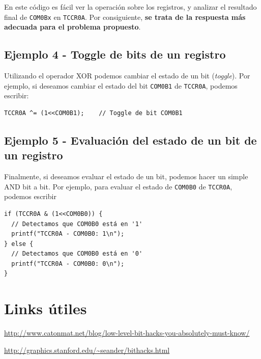 \documentclass[paper=a4, fontsize=11pt]{scrartcl}	%
\numberwithin{equation}{section} %
\numberwithin{figure}{section} %
\numberwithin{table}{section} %
\begin{document}
En este código es fácil ver la operación sobre los registros,
y analizar el resultado final de \verb|COM0Bx| en \verb|TCCR0A|. Por
consiguiente, \textbf{se trata de la respuesta más adecuada para el
problema propuesto}.

\subsection{Ejemplo 4 - Toggle de bits de un registro}

Utilizando el operador XOR podemos cambiar el estado de un bit
(\emph{toggle}). Por ejemplo, si deseamos cambiar el estado del bit
\verb|COM0B1| de \verb|TCCR0A|, podemos escribir:

\begin{verbatim}
TCCR0A ^= (1<<COM0B1);    // Toggle de bit COM0B1
\end{verbatim}

\subsection{Ejemplo 5 - Evaluación del estado de un bit de un registro}

Finalmente, si deseamos evaluar el estado de un bit, podemos
hacer un simple AND {bit a bit}. Por ejemplo, para evaluar el
estado de \verb|COM0B0| de \verb|TCCR0A|, podemos escribir

\begin{verbatim}
if (TCCR0A & (1<<COM0B0)) {
  // Detectamos que COM0B0 está en '1'
  printf("TCCR0A - COM0B0: 1\n");
} else {
  // Detectamos que COM0B0 está en '0'
  printf("TCCR0A - COM0B0: 0\n");
}
\end{verbatim}

\section{Links útiles}

{
  \footnotesize
\url{http://www.catonmat.net/blog/low-level-bit-hacks-you-absolutely-must-know/}

\url{http://graphics.stanford.edu/~seander/bithacks.html}
}
\end{document}
